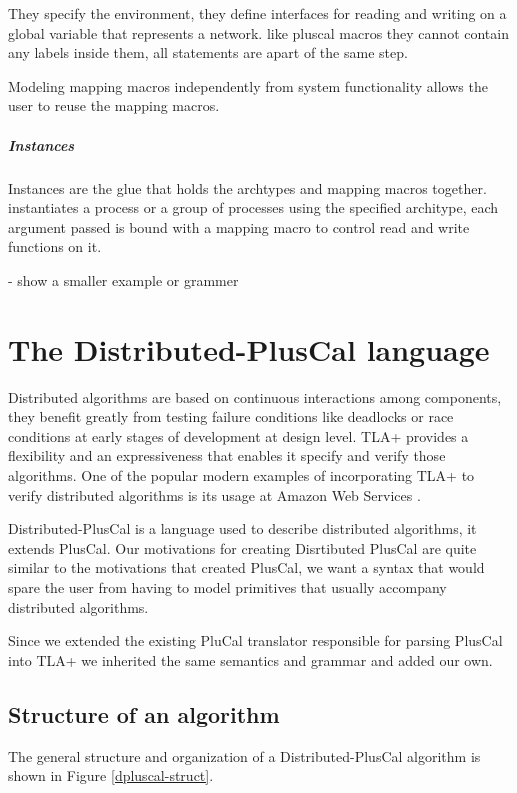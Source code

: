 \documentclass{thesul}
\begin{document}
They specify the environment, they define interfaces for reading and writing on a global variable that represents a network.
like pluscal macros they cannot contain any labels inside them, all statements are apart of the same step.

Modeling mapping macros independently from system functionality allows the user to reuse the mapping macros.

\paragraph{Instances}

Instances are the glue that holds the archtypes and mapping macros together.
instantiates a process or a group of processes using the specified architype, each argument passed is bound with a mapping macro to control read and write functions on it.

- show a smaller example or grammer

\chapter{The Distributed-PlusCal language}


Distributed algorithms are based on continuous interactions among components, they benefit greatly from testing failure conditions like deadlocks or race conditions at early stages of development at design level.
TLA+ provides a flexibility and an expressiveness that enables it specify and verify those algorithms. One of the popular modern examples of incorporating TLA+ to verify distributed algorithms is its usage at Amazon Web Services \cite{amazon}.

Distributed-PlusCal is a language used to describe distributed algorithms, it extends PlusCal. 
Our motivations for creating Disrtibuted PlusCal are quite similar to the motivations that created PlusCal, we want a syntax that would spare the user from having to model primitives that usually accompany distributed algorithms.

Since we extended the existing PluCal translator responsible for parsing PlusCal into TLA+ we inherited the same semantics and grammar and added our own.

\section{Structure of an algorithm}

The general structure and organization of a Distributed-PlusCal algorithm is shown in Figure \ref{dpluscal-struct}.
\end{document}
